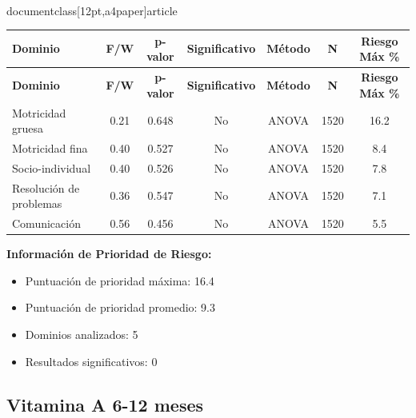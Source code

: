 \\documentclass[12pt,a4paper]{article}
\begin{document}
\begin{longtable}{|l|c|c|c|c|c|c|}
\hline
\textbf{Dominio} & \textbf{F/W} & \textbf{p-valor} & \textbf{Significativo} & \textbf{Método} & \textbf{N} & \textbf{Riesgo Máx \%} \\
\hline
\endfirsthead

\hline
\textbf{Dominio} & \textbf{F/W} & \textbf{p-valor} & \textbf{Significativo} & \textbf{Método} & \textbf{N} & \textbf{Riesgo Máx \%} \\
\hline
\endhead

\hline
\endfoot

\hline
\endlastfoot

Motricidad gruesa & 0.21 & 0.648 & No & ANOVA & 1520 & 16.2 \\
Motricidad fina & 0.40 & 0.527 & No & ANOVA & 1520 & 8.4 \\
Socio-individual & 0.40 & 0.526 & No & ANOVA & 1520 & 7.8 \\
Resolución de problemas & 0.36 & 0.547 & No & ANOVA & 1520 & 7.1 \\
Comunicación & 0.56 & 0.456 & No & ANOVA & 1520 & 5.5 \\

\end{longtable}


\textbf{Información de Prioridad de Riesgo:}
\begin{itemize}
\item Puntuación de prioridad máxima: 16.4
\item Puntuación de prioridad promedio: 9.3
\item Dominios analizados: 5
\item Resultados significativos: 0
\end{itemize}


\subsection{Vitamina A 6-12 meses}
\end{document}
